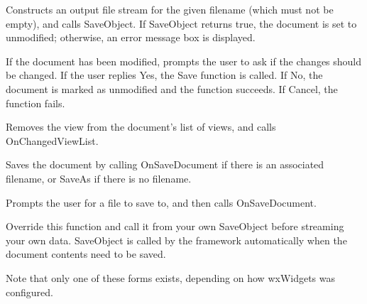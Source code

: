 

Constructs an output file stream for the given filename (which must not be empty),
and calls SaveObject. If SaveObject returns true, the document is set to
unmodified; otherwise, an error message box is displayed.



If the document has been modified, prompts the user to ask if the changes should
be changed. If the user replies Yes, the Save function is called. If No, the
document is marked as unmodified and the function succeeds. If Cancel, the
function fails.



Removes the view from the document's list of views, and calls OnChangedViewList.



Saves the document by calling OnSaveDocument if there is an associated filename,
or SaveAs if there is no filename.



Prompts the user for a file to save to, and then calls OnSaveDocument.




Override this function and call it from your own SaveObject before
streaming your own data. SaveObject is called by the framework
automatically when the document contents need to be saved.

Note that only one of these forms exists, depending on how wxWidgets
was configured.



